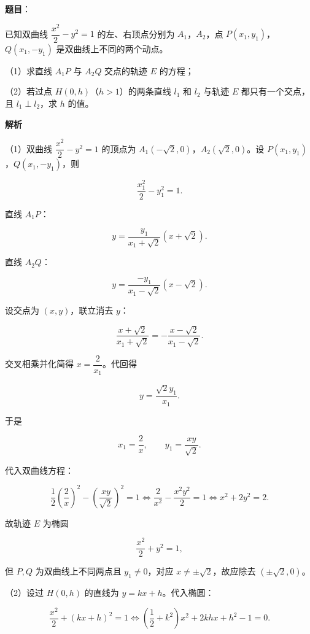 \begin{answer}

\textbf{题目}：

已知双曲线 $\dfrac{x^2}{2}-y^2=1$ 的左、右顶点分别为 $A_1$，$A_2$，点 $P(x_1,y_1)$，$Q(x_1,-y_1)$ 是双曲线上不同的两个动点。

（1）求直线 $A_1P$ 与 $A_2Q$ 交点的轨迹 $E$ 的方程；

（2）若过点 $H(0,h)$（$h>1$）的两条直线 $l_1$ 和 $l_2$ 与轨迹 $E$ 都只有一个交点，且 $l_1\perp l_2$，求 $h$ 的值。

\textbf{解析}

（1）双曲线 $\dfrac{x^2}2-y^2=1$ 的顶点为 $A_1(-\sqrt2,0)$，$A_2(\sqrt2,0)$。设 $P(x_1,y_1)$，$Q(x_1,-y_1)$，则

\nopagebreak[4]
\[\frac{x_1^2}2-y_1^2=1.\]

直线 $A_1P$：

\nopagebreak[4]
\[y=\frac{y_1}{x_1+\sqrt2}(x+\sqrt2).\]

直线 $A_2Q$：

\nopagebreak[4]
\[y=\frac{-y_1}{x_1-\sqrt2}(x-\sqrt2).\]

设交点为 $(x,y)$，联立消去 $y$：

\nopagebreak[4]
\[\frac{x+\sqrt2}{x_1+\sqrt2}=-\frac{x-\sqrt2}{x_1-\sqrt2}.\]

交叉相乘并化简得 $x=\dfrac2{x_1}$。代回得

\nopagebreak[4]
\[y=\frac{\sqrt2y_1}{x_1}.\]

于是

\nopagebreak[4]
\[x_1=\frac2x,\qquad y_1=\frac{xy}{\sqrt2}.\]

代入双曲线方程：

\nopagebreak[4]
\[\frac12\left(\frac2x\right)^2-\left(\frac{xy}{\sqrt2}\right)^2=1
\iff \frac2{x^2}-\frac{x^2y^2}2=1
\iff x^2+2y^2=2.\]

故轨迹 $E$ 为椭圆

\nopagebreak[4]
\[\frac{x^2}2+y^2=1,\]

但 $P,Q$ 为双曲线上不同两点且 $y_1\neq0$，对应 $x\neq\pm\sqrt2$，故应除去 $(\pm\sqrt2,0)$。

（2）设过 $H(0,h)$ 的直线为 $y=kx+h$。代入椭圆：

\nopagebreak[4]
\[\frac{x^2}2+(kx+h)^2=1
\iff \left(\frac12+k^2\right)x^2+2khx+h^2-1=0.\]


\end{answer}
